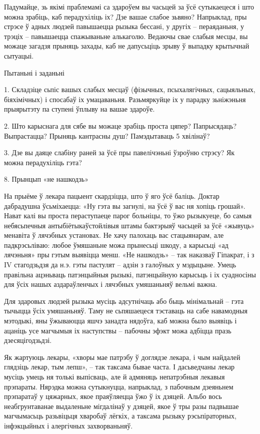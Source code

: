 Падумайце, зь якімі праблемамі са здароўем вы часьцей за ўсё сутыкаецеся і што можна зрабіць, каб перадухіліць іх? Дзе вашае слабое зьвяно? Напрыклад, пры стрэсе ў адных людзей павышаецца рызыка бессані, у другіх – пераяданьня, у трэціх – павышаецца спажываньне алькаголю. Ведаючы свае слабыя месцы, вы можаце загадзя прыняць захады, каб не дапусьціць зрыву ў выпадку крытычнай сытуацыі.

Пытаньні і заданьні

1. Складзіце сьпіс вашых слабых месцаў (фізычных, псыхалягічных, сацыяльных, біяхімічных) і спосабаў іх умацаваньня. Разьмяркуйце іх у парадку зьніжэньня прыярытэту па ступені ўплыву на вашае здароўе.

2. Што карыснага для сябе вы можаце зрабіць проста цяпер? Папрысядаць? Выпрастацца? Прыняць кантрасны душ? Памэдытаваць 5 хвілінаў?

3. Дзе вы даяце слабіну раней за ўсё пры павелічэньні ўзроўню стрэсу? Як можна перадухіліць гэта?


8. Прынцып «не нашкодзь»

На прыёме ў лекара пацыент скардзіцца, што ў яго ўсё баліць. Доктар дабрадушна ўсьміхаецца: «Ну гэта вы загнулі, на ўсё ў вас ня хопіць грошай». Нават калі вы проста пераступаеце парог больніцы, то ўжо рызыкуеце, бо самыя небясьпечныя антыбіётыкаўстойлівыя штамы бактэрыяў часьцей за ўсё «жывуць» менавіта ў лячэбных установах. Не хачу палохаць вас стацыянарам, але падкрэсьліваю: любое ўмяшаньне можа прынесьці шкоду, а карысьці «ад лячэньня» пры гэтым выявіцца менш. «Не нашкодзь» – так наказваў Гіпакрат, і з IV стагодзьдзя да н.э. гэты пастулят – адзін з галоўных у мэдыцыне. Умець правільна ацэньваць патэнцыйныя рызыкі, патэнцыйную карысьць і іх суадносіны для ўсіх нашых аздараўленчых і лячэбных умяшаньняў вельмі важна.

Для здаровых людзей рызыка мусіць адсутнічаць або быць мінімальнай – гэта тычыцца ўсіх умяшаньняў. Таму не сьпяшаецеся тэставаць на сабе навамодныя мэтодыкі, яны ўжываюцца яшчэ занадта нядоўга, каб можна было выявіць і ацаніць усе магчымыя іх наступствы – пабочны эфэкт можа адбіцца празь дзесяцігодзьдзі.

Як жартуюць лекары, «хворы мае патрэбу ў доглядзе лекара, і чым найдалей глядзіць лекар, тым лепш», -- так таксама бывае часта. І дасьведчаны лекар мусіць умець ня толькі выпісваць, але й адмяняць непатрэбныя лекавыя прэпараты. Нярэдка можна сутыкнуцца, напрыклад, з пабочным дзеяньнем прэпаратаў у цяжарных, якое праяўляецца ўжо ў іх дзяцей. Альбо вось неабгрунтаванае выдаленьне мігдалінаў у дзяцей, якое ў тры разы падвышае магчымасьць разьвіцьця хваробаў лёгкіх, а таксама рызыку рэсьпіраторных, інфэкцыйных і алергічных захворваньняў.

